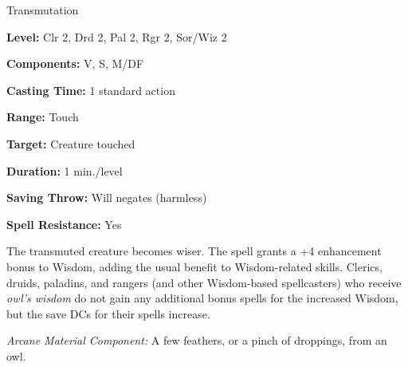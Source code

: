 
Transmutation

\textbf{Level:} Clr 2, Drd 2, Pal 2, Rgr 2, Sor/Wiz 2

\textbf{Components:} V, S, M/DF

\textbf{Casting Time:} 1 standard action

\textbf{Range:} Touch

\textbf{Target:} Creature touched

\textbf{Duration:} 1 min./level

\textbf{Saving Throw:} Will negates (harmless)

\textbf{Spell Resistance:} Yes

The transmuted creature becomes wiser. The spell grants a +4 enhancement bonus 
to Wisdom, adding the usual benefit to Wisdom-related skills. Clerics, druids, 
paladins, and rangers (and other Wisdom-based spellcasters) who receive \textit{owl's 
wisdom} do not gain any additional bonus spells for the increased Wisdom, but the 
save DCs for their spells increase.

\textit{Arcane Material Component:} A few feathers, or a pinch of droppings, from 
an owl.

